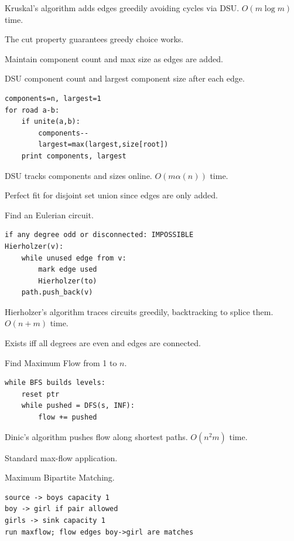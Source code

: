 \Solution Kruskal's algorithm adds edges greedily avoiding cycles via DSU. $O(m \log m)$ time.

\Analysis The cut property guarantees greedy choice works.


\Problem Maintain component count and max size as edges are added.

\State DSU component count and largest component size after each edge.
\begin{lstlisting}
components=n, largest=1
for road a-b:
    if unite(a,b):
        components--
        largest=max(largest,size[root])
    print components, largest
\end{lstlisting}

\Solution DSU tracks components and sizes online. $O(m \alpha(n))$ time.

\Analysis Perfect fit for disjoint set union since edges are only added.


\Problem Find an Eulerian circuit.

\begin{lstlisting}
if any degree odd or disconnected: IMPOSSIBLE
Hierholzer(v):
    while unused edge from v:
        mark edge used
        Hierholzer(to)
    path.push_back(v)
\end{lstlisting}

\Solution Hierholzer's algorithm traces circuits greedily, backtracking to splice them. $O(n+m)$ time.

\Analysis Exists iff all degrees are even and edges are connected.


\Problem Find Maximum Flow from 1 to $n$.

\begin{lstlisting}
while BFS builds levels:
    reset ptr
    while pushed = DFS(s, INF):
        flow += pushed
\end{lstlisting}

\Solution Dinic's algorithm pushes flow along shortest paths. $O(n^2 m)$ time.

\Analysis Standard max-flow application.


\Problem Maximum Bipartite Matching.

\begin{lstlisting}
source -> boys capacity 1
boy -> girl if pair allowed
girls -> sink capacity 1
run maxflow; flow edges boy->girl are matches
\end{lstlisting}

